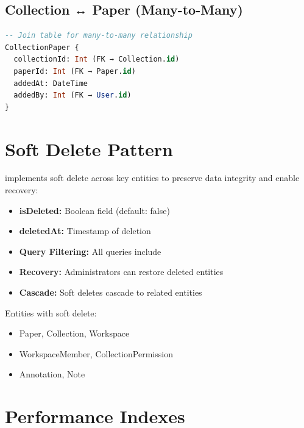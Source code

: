 \subsection{Collection ↔ Paper (Many-to-Many)}

\begin{lstlisting}[language=SQL, caption={Collection-Paper Many-to-Many}]
-- Join table for many-to-many relationship
CollectionPaper {
  collectionId: Int (FK → Collection.id)
  paperId: Int (FK → Paper.id)
  addedAt: DateTime
  addedBy: Int (FK → User.id)
}
\end{lstlisting}

\section{Soft Delete Pattern}
\label{sec:erd-soft-delete}

\begin{infobox}
\projectname{} implements soft delete across key entities to preserve data integrity and enable recovery:

\begin{itemize}
    \item \textbf{isDeleted:} Boolean field (default: false)
    \item \textbf{deletedAt:} Timestamp of deletion
    \item \textbf{Query Filtering:} All queries include 
    \item \textbf{Recovery:} Administrators can restore deleted entities
    \item \textbf{Cascade:} Soft deletes cascade to related entities
\end{itemize}
\end{infobox}

Entities with soft delete:
\begin{itemize}
    \item Paper, Collection, Workspace
    \item WorkspaceMember, CollectionPermission
    \item Annotation, Note
\end{itemize}

\section{Performance Indexes}
\label{sec:erd-indexes}

